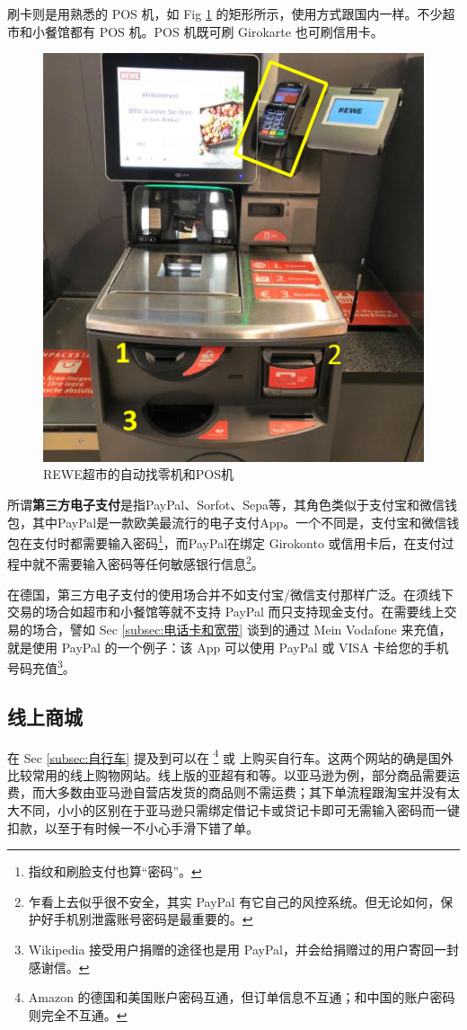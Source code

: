     刷卡则是用熟悉的 POS 机，如 Fig \ref{fig:REWE超市的自动找零机和POS机} 的矩形所示，使用方式跟国内一样。不少超市和小餐馆都有 POS 机。POS 机既可刷 Girokarte 也可刷信用卡。

    \begin{figure}[ht]
      \centering
      \includegraphics[width=.4\textwidth]{在亚琛学习和生活/日常消费和饮食/REWE超市的自动找零机和POS机.png}
      \caption{REWE超市的自动找零机和POS机}
      \label{fig:REWE超市的自动找零机和POS机}
    \end{figure}

    所谓\textbf{第三方电子支付}是指PayPal、Sorfot、Sepa等，其角色类似于支付宝和微信钱包，其中PayPal是一款欧美最流行的电子支付App。一个不同是，支付宝和微信钱包在支付时都需要输入密码\footnote{指纹和刷脸支付也算``密码''。}，而PayPal在绑定 Girokonto 或信用卡后，在支付过程中就不需要输入密码等任何敏感银行信息\footnote{乍看上去似乎很不安全，其实 PayPal 有它自己的风控系统。但无论如何，保护好手机别泄露账号密码是最重要的。}。

    在德国，第三方电子支付的使用场合并不如支付宝/微信支付那样广泛。在须线下交易的场合如超市和小餐馆等就不支持 PayPal 而只支持现金支付。在需要线上交易的场合，譬如 Sec \ref{subsec:电话卡和宽带} 谈到的通过 Mein Vodafone 来充值，就是使用 PayPal 的一个例子：该 App 可以使用 PayPal 或 VISA 卡给您的手机号码充值\footnote{Wikipedia 接受用户捐赠的途径也是用 PayPal，并会给捐赠过的用户寄回一封感谢信。}。

  \subsection{线上商城}\label{subsec:线上商城}

    在 Sec \ref{subsec:自行车} 提及到可以在 \href{https://amazon.de/}{}\footnote{Amazon 的德国和美国账户密码互通，但订单信息不互通；和中国的账户密码则完全不互通。} 或 \href{https://www.ebay.de/}{} 上购买自行车。这两个网站的确是国外比较常用的线上购物网站。线上版的亚超有\href{https://www.yachao.de/}{}和\href{https://www.yachaoonline.com/index.php}{}等。以亚马逊为例，部分商品需要运费，而大多数由亚马逊自营店发货的商品则不需运费；其下单流程跟淘宝并没有太大不同，小小的区别在于亚马逊只需绑定借记卡或贷记卡即可无需输入密码而一键扣款，以至于有时候一不小心手滑下错了单。

